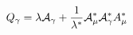 \begin{equation}
Q_\gamma= \lambda {\cal{A}}_\gamma + \frac{1}{\lambda^*} {\cal{A}}_\mu^* {\cal{A}}_\gamma^* A_\mu^*
\end{equation}

